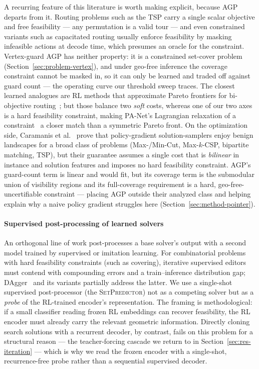 \documentclass[preprint,10pt]{elsarticle}
\newcommand{\SetPredictor}{\textup{\textsc{SetPredictor}}}
\begin{document}
A recurring feature of this literature is worth making explicit, because AGP departs from it. Routing problems such as the TSP carry a single scalar objective and free feasibility --- any permutation is a valid tour --- and even constrained variants such as capacitated routing usually enforce feasibility by masking infeasible actions at decode time, which presumes an oracle for the constraint. Vertex-guard AGP has neither property: it is a constrained set-cover problem (Section~\ref{sec:problem-vertex}), and under geo-free inference the coverage constraint cannot be masked in, so it can only be learned and traded off against guard count --- the operating curve our threshold sweep traces. The closest learned analogues are RL methods that approximate Pareto frontiers for bi-objective routing~\cite{Mehta2022PANet,Li2019DRLMOA}; but those balance two \emph{soft} costs, whereas one of our two axes is a hard feasibility constraint, making PA-Net's Lagrangian relaxation of a constraint~\cite{Mehta2022PANet} a closer match than a symmetric Pareto front. On the optimization side, Caramanis et al.~\cite{Caramanis2023Landscape} prove that policy-gradient solution-samplers enjoy benign landscapes for a broad class of problems (Max-/Min-Cut, Max-$k$-CSP, bipartite matching, TSP), but their guarantee assumes a single cost that is \emph{bilinear} in instance and solution features and imposes no hard feasibility constraint. AGP's guard-count term is linear and would fit, but its coverage term is the submodular union of visibility regions and its full-coverage requirement is a hard, geo-free-uncertifiable constraint --- placing AGP outside their analyzed class and helping explain why a naive policy gradient struggles here (Section~\ref{sec:method-pointer}).

\paragraph{Supervised post-processing of learned solvers} An orthogonal line of work post-processes a base solver's output with a second model trained by supervised or imitation learning. For combinatorial problems with hard feasibility constraints (such as covering), iterative supervised editors must contend with compounding errors and a train--inference distribution gap; DAgger~\cite{RossGordonBagnell2011DAgger} and its variants partially address the latter. We use a single-shot supervised post-processor (the \SetPredictor{}) not as a competing solver but as a \emph{probe} of the RL-trained encoder's representation. The framing is methodological: if a small classifier reading frozen RL embeddings can recover feasibility, the RL encoder must already carry the relevant geometric information. Directly cloning search solutions with a recurrent decoder, by contrast, fails on this problem for a structural reason --- the teacher-forcing cascade we return to in Section~\ref{sec:res-iteration} --- which is why we read the frozen encoder with a single-shot, recurrence-free probe rather than a sequential supervised decoder.
\end{document}
